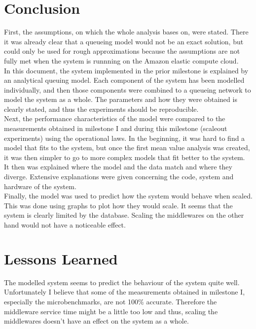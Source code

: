 \documentclass[a4paper]{article}
\begin{document}
\pagebreak

\section{Conclusion}

First, the assumptions, on which the whole analysis bases on, were stated. There it was already clear that a queueing model would not be an exact solution, but could only be used for rough approximations because the assumptions are not fully met when the system is runnning on the Amazon elastic compute cloud.\\

In this document, the system implemented in the prior milestone\cite{milestone1} is explained by an analytical queuing model. Each component of the system has been modelled individually, and then those components were combined to a queueing network to model the system as a whole. The parameters and how they were obtained is clearly stated, and thus the experiments should be reproducible.\\

Next, the performance characteristics of the model were compared to the measurements obtained in milestone I\cite{milestone1} and during this milestone (scaleout experiments) using the operational laws. In the beginning, it was hard to find a model that fits to the system, but once the first mean value analysis was created, it was then simpler to go to more complex models that fit better to the system.\\

It then was explained where the model and the data match and where they diverge. Extensive explanations were given concerning the code, system and hardware of the system.\\

Finally, the model was used to predict how the system would behave when scaled. This was done using graphs to plot how they would scale. It seems that the system is clearly limited by the database. Scaling the middlewares on the other hand would not have a noticeable effect.\\


\pagebreak

\section{Lessons Learned}

The modelled system seems to predict the behaviour of the system quite well. Unfortunately I believe that some of the measurements obtained in milestone I\cite{milestone1}, especially the microbenchmarks, are not 100\% accurate. Therefore the middleware service time might be a little too low and thus, scaling the middlewares doesn't have an effect on the system as a whole.\\
\end{document}

